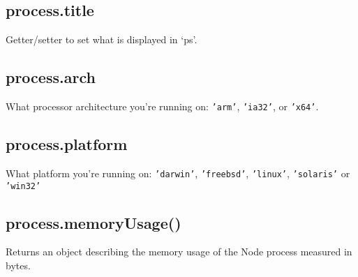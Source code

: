 \subsection{process.title}

Getter/setter to set what is displayed in `ps'.

\subsection{process.arch}

What processor architecture you're running on: \texttt{'arm'},
\texttt{'ia32'}, or \texttt{'x64'}.

\begin{Shaded}
\begin{Highlighting}[]
\NormalTok{(} \NormalTok{+ }\NormalTok{);}
\end{Highlighting}
\end{Shaded}

\subsection{process.platform}

What platform you're running on: \texttt{'darwin'}, \texttt{'freebsd'},
\texttt{'linux'}, \texttt{'solaris'} or \texttt{'win32'}

\begin{Shaded}
\begin{Highlighting}[]
\NormalTok{(} \NormalTok{+ }\NormalTok{);}
\end{Highlighting}
\end{Shaded}

\subsection{process.memoryUsage()}

Returns an object describing the memory usage of the Node process
measured in bytes.

\begin{Shaded}
\begin{Highlighting}[]
 \NormalTok{);}

\NormalTok{(}\NormalTok{(}\NormalTok{()));}
\end{Highlighting}
\end{Shaded}


